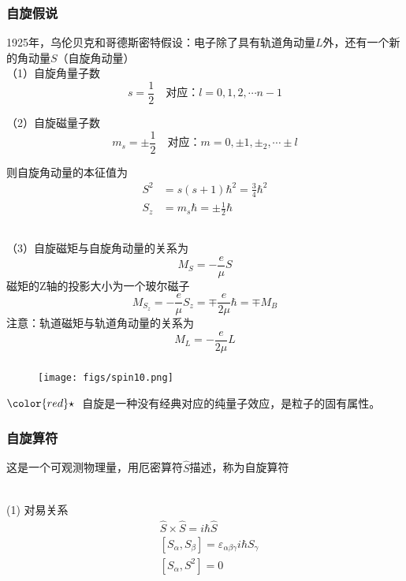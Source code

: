 \begin{frame}
  \frametitle{自旋假说}
1925年，乌伦贝克和哥德斯密特假设：电子除了具有轨道角动量$L$外，还有一个新的角动量$S$（自旋角动量）\\

（1）自旋角量子数 
\[s = \frac{1}{2} \quad \text{对应：} l= 0,1,2,\cdots n-1\]

（2）自旋磁量子数 
\[m_s = \pm \frac{1}{2} \quad \text{对应：} m= 0,\pm 1,\pm_2,\cdots \pm l\]

则自旋角动量的本征值为
\[\begin{aligned}
  S^2 &= s(s+1) \hbar^2 = \frac{3}{4} \hbar^2 \\
  S_z &= m_s \hbar = \pm \frac{1}{2} \hbar \\
\end{aligned}\]
\end{frame} 

\begin{frame}[label=current]
  \frametitle{}
（3）自旋磁矩与自旋角动量的关系为
\[ M_S = - \frac{e}{\mu} S\]
磁矩的Z轴的投影大小为一个玻尔磁子
\[ M_{S_z} = - \frac{e}{\mu} S_z = \mp \frac{e}{2\mu } \hbar = \mp M_{B} \]
注意：轨道磁矩与轨道角动量的关系为
\[ M_L = - \frac{e}{2\mu} L\]
\end{frame} 

\begin{frame}[label=current]
  \frametitle{}
\begin{figure}[htbp]
  \centering
  \texttt{[image: figs/spin10.png]}
\end{figure}
${\color{red}\star}~$ 自旋是一种没有经典对应的纯量子效应，是粒子的固有属性。
\end{frame} 


\begin{frame}
  \frametitle{自旋算符}
这是一个可观测物理量，用厄密算符$\hat{S}$描述，称为自旋算符 

~~\\ 
(1) 对易关系
\[
\begin{aligned}
  &\hat{S}\times \hat{S} = i\hbar \hat{S} \\
  &[S_\alpha, S_\beta ] = \varepsilon_{\alpha\beta\gamma} i\hbar S_\gamma  \\
  &[S_\alpha, S^2] =0
\end{aligned}  
\]
\end{frame} 

